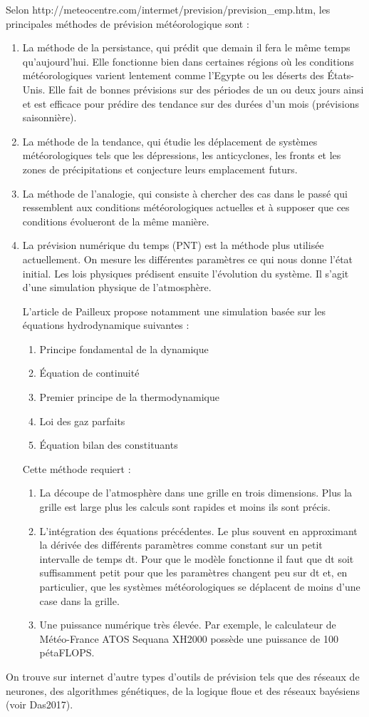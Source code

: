 \documentclass[11pt,a4paper]{article}
\begin{document}
Selon http://meteocentre.com/intermet/prevision/prevision\_emp.htm, 
les principales méthodes de prévision météorologique sont :
\begin{enumerate}
\item La méthode de la persistance, qui prédit que demain il fera le même temps qu'aujourd'hui. Elle fonctionne bien dans certaines régions où les conditions météorologiques varient lentement comme	l'Egypte ou les déserts des États-Unis. Elle fait de bonnes prévisions sur des périodes de un ou deux jours ainsi et est efficace pour prédire des tendance sur des durées d'un mois (prévisions saisonnière). 
\item La méthode de la tendance, qui étudie les déplacement de systèmes météorologiques tels que les dépressions, les anticyclones, les fronts et les zones de précipitations et conjecture leurs emplacement futurs.
\item La méthode de l'analogie, qui consiste à chercher des cas dans le passé qui ressemblent aux conditions météorologiques actuelles et à supposer que ces conditions évolueront de la même manière.
\item La prévision numérique du temps (PNT) est la méthode plus utilisée actuellement. On mesure les différentes paramètres ce qui nous donne l'état initial. Les lois physiques prédisent ensuite l'évolution du système. Il s'agit d'une simulation physique de l'atmosphère. 

L'article de Pailleux \cite{PAILLEUX} propose notamment une simulation basée sur les équations hydrodynamique suivantes : 
\begin {enumerate}
\item Principe fondamental de la dynamique
\item Équation de continuité
\item Premier principe de la thermodynamique
\item Loi des gaz parfaits
\item Équation bilan des constituants
\end {enumerate}
Cette méthode requiert :
\begin{enumerate} 
\item La découpe de l'atmosphère dans une grille en trois dimensions. Plus la grille est large plus les calculs sont rapides et moins ils sont précis.
\item L'intégration des équations précédentes. Le plus souvent en approximant la dérivée des différents paramètres comme constant sur un petit intervalle de temps dt. Pour que le modèle fonctionne il faut que dt soit suffisamment petit pour que les paramètres changent peu sur dt et, en particulier, que les systèmes météorologiques se déplacent de moins d'une case dans la grille.
\item Une puissance numérique très élevée. Par exemple, le calculateur de Météo-France ATOS Sequana XH2000 possède une puissance de 100 pétaFLOPS. 
\end{enumerate}
\end{enumerate}
On trouve sur internet d'autre types d'outils de prévision tels que des réseaux de neurones, des algorithmes génétiques, de la logique floue et des réseaux bayésiens %
 (voir Das2017).
\end{document}
